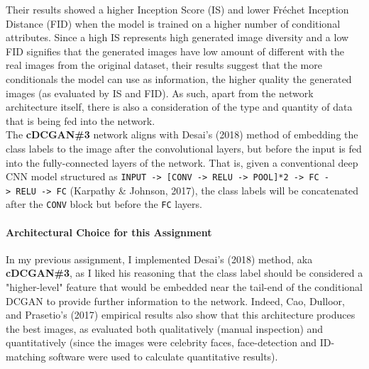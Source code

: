\documentclass[11pt]{article}
\begin{document}
      \begin{center}
    \end{center}
    
          \begin{center}
    \end{center}
    
          \begin{center}
    \end{center}

Their results showed a higher Inception Score (IS) and lower Fréchet
Inception Distance (FID) when the model is trained on a higher number of
conditional attributes. Since a high IS represents high generated image
diversity and a low FID signifies that the generated images have low
amount of different with the real images from the original dataset,
their results suggest that the more conditionals the model can use as
information, the higher quality the generated images (as evaluated by IS
and FID). As such, apart from the network architecture itself, there is
also a consideration of the type and quantity of data that is being fed
into the network.\\

The \textbf{cDCGAN\#3} network aligns with Desai's (2018) method of
embedding the class labels to the image after the convolutional layers,
but before the input is fed into the fully-connected layers of the
network. That is, given a conventional deep CNN model structured as
\texttt{INPUT\ -\textgreater{}\ {[}CONV\ -\textgreater{}\ RELU\ -\textgreater{}\ POOL{]}*2\ -\textgreater{}\ FC\ -\textgreater{}\ RELU\ -\textgreater{}\ FC}
(Karpathy \& Johnson, 2017), the class labels will be concatenated after
the \texttt{CONV} block but before the \texttt{FC} layers.

\paragraph{Architectural Choice for this
Assignment}\label{architectural-choice-for-this-assignment}

In my previous assignment, I implemented Desai's (2018) method, aka
\textbf{cDCGAN\#3}, as I liked his reasoning that the class label should
be considered a "higher-level" feature that would be embedded near the
tail-end of the conditional DCGAN to provide further information to the
network. Indeed, Cao, Dulloor, and Prasetio's (2017) empirical results
also show that this architecture produces the best images, as evaluated
both qualitatively (manual inspection) and quantitatively (since the
images were celebrity faces, face-detection and ID-matching software
were used to calculate quantitative results).\\
\end{document}
